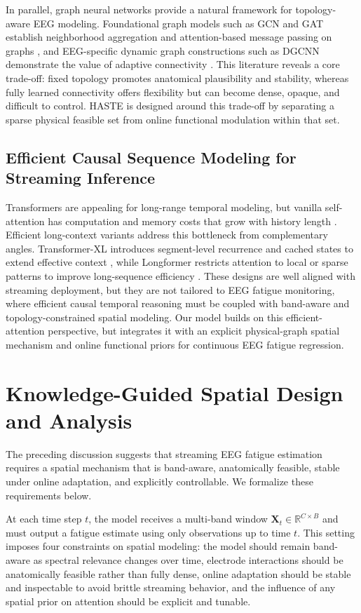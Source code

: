 \documentclass[preprint,12pt]{elsarticle}
\begin{document}
In parallel, graph neural networks provide a natural framework for topology-aware EEG modeling. 
Foundational graph models such as GCN and GAT establish neighborhood aggregation and attention-based message passing on graphs \cite{kipf2016semi,velivckovic2017graph}, and EEG-specific dynamic graph constructions such as DGCNN demonstrate the value of adaptive connectivity \cite{Song2018DGCNN}. 
This literature reveals a core trade-off: fixed topology promotes anatomical plausibility and stability, whereas fully learned connectivity offers flexibility but can become dense, opaque, and difficult to control. 
HASTE is designed around this trade-off by separating a sparse physical feasible set from online functional modulation within that set.

\subsection{Efficient Causal Sequence Modeling for Streaming Inference}

Transformers are appealing for long-range temporal modeling, but vanilla self-attention has computation and memory costs that grow with history length \cite{vaswani2017attention}. 
Efficient long-context variants address this bottleneck from complementary angles. 
Transformer-XL introduces segment-level recurrence and cached states to extend effective context \cite{dai2019transformer}, while Longformer restricts attention to local or sparse patterns to improve long-sequence efficiency \cite{Beltagy2020Longformer}. 
These designs are well aligned with streaming deployment, but they are not tailored to EEG fatigue monitoring, where efficient causal temporal reasoning must be coupled with band-aware and topology-constrained spatial modeling. 
Our model builds on this efficient-attention perspective, but integrates it with an explicit physical-graph spatial mechanism and online functional priors for continuous EEG fatigue regression.
\section{Knowledge-Guided Spatial Design and Analysis}
\label{sec:theory}

The preceding discussion suggests that streaming EEG fatigue estimation requires a spatial mechanism that is band-aware, anatomically feasible, stable under online adaptation, and explicitly controllable. We formalize these requirements below.

At each time step $t$, the model receives a multi-band window
$\mathbf{X}_t\in\mathbb{R}^{C\times B}$ and must output a fatigue estimate using only observations up to time $t$.
This setting imposes four constraints on spatial modeling:
the model should remain band-aware as spectral relevance changes over time,
electrode interactions should be anatomically feasible rather than fully dense,
online adaptation should be stable and inspectable to avoid brittle streaming behavior,
and the influence of any spatial prior on attention should be explicit and tunable.
\end{document}
